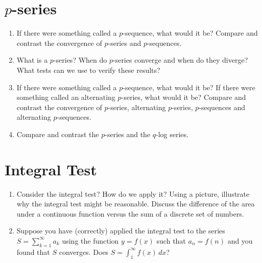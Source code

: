 \section{$p$-series}
\begin{enumerate}

\item If there were something called a $p$-sequence, what would it be?  Compare and contrast the convergence of $p$-series and $p$-sequences.

\item What is a $p$-series?  When do $p$-series converge and when do they diverge?  What tests can we use to verify these results?  

\item If there were something called a $p$-sequence, what would it be?  If there were something called an alternating $p$-series, what would it be?  Compare and contrast the convergence of $p$-series, alternating $p$-series, $p$-sequences and alternating $p$-sequences.

\item Compare and contrast the $p$-series and the $q$-log series.

\end{enumerate}
\section{Integral Test}
\begin{enumerate}

\item Consider the integral test?  How do we apply it?  Using a picture, illustrate why the integral test might be reasonable.  Discuss the difference of the area under a continuous function versus the sum of a discrete set of numbers.

\item Suppose you have (correctly) applied the integral test to the series $
S = \displaystyle\sum\limits_{k = 1}^\infty  {a_k } $ using the function $y = f(x)$ such that $a_n = f(n)$ and you found that $S$ converges.  Does $S = \int_1^\infty  {f(x)\,dx} $?

\end{enumerate}

